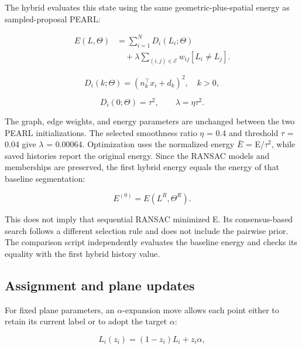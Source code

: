 The hybrid evaluates this state using the same geometric-plus-spatial energy as sampled-proposal PEARL:

\begin{equation}
\begin{aligned}E(L,\Theta)&=\sum_{i=1}^{N}D_i(L_i;\Theta)\\&\quad+\lambda\sum_{(i,j)\in\mathcal E}w_{ij}[L_i\ne L_j].\end{aligned}
\label{eq:47}
\end{equation}

\begin{equation}
D_i(k;\Theta)=(n_k^\top x_i+d_k)^2,\quad k>0,
\label{eq:48}
\end{equation}

\begin{equation}
D_i(0;\Theta)=\tau^2,\qquad\lambda=\eta\tau^2.
\label{eq:49}
\end{equation}

The graph, edge weights, and energy parameters are unchanged between the two PEARL initializations. The selected smoothness ratio \(\eta\) = 0.4 and threshold \(\tau\) = 0.04 give \(\lambda\) = 0.00064. Optimization uses the normalized energy \(\bar E\) = E/\(\tau^{2}\), while saved histories report the original energy. Since the RANSAC models and memberships are preserved, the first hybrid energy equals the energy of that baseline segmentation:

\begin{equation}
E^{(0)}=E(L^R,\Theta^R).
\label{eq:50}
\end{equation}

This does not imply that sequential RANSAC minimized E. Its consensus-based search follows a different selection rule and does not include the pairwise prior. The comparison script independently evaluates the baseline energy and checks its equality with the first hybrid history value.

\subsection{Assignment and plane updates}\label{assignment-and-plane-updates}

For fixed plane parameters, an \(\alpha\)-expansion move allows each point either to retain its current label or to adopt the target \(\alpha\):

\begin{equation}
L_i(z_i)=(1-z_i)L_i+z_i\alpha,
\label{eq:51}
\end{equation}

